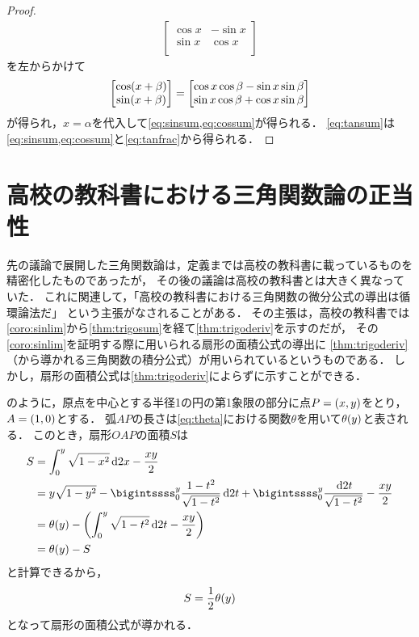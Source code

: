 \documentclass[11pt,a4paper]{ltjsarticle}
\newcommand*{\coord}[1]{\paren{#1}}
\newcommand*{\intd}{\dl2}
\theoremstyle{definition}
\begin{document}
\begin{proof}
\begin{align*}
\begin{bmatrix}
      \cos x & - \sin x \\
      \sin x & \cos x   \\
    \end{bmatrix}
  \end{align*}
  を左からかけて
  \begin{align}
    \begin{bmatrix}
      \apply{\cos}{x + \beta} \\
      \apply{\sin}{x + \beta} \\
    \end{bmatrix}
    =
    \begin{bmatrix}
      \cos x \cos \beta - \sin x \sin \beta \\
      \sin x \cos \beta + \cos x \sin \beta \\
    \end{bmatrix}
    \label{eq:trigosumx}
  \end{align}
  が得られ，$x = \alpha$を代入して\cref{eq:sinsum,eq:cossum}が得られる．
  \cref{eq:tansum}は\cref{eq:sinsum,eq:cossum}と\cref{eq:tanfrac}から得られる．
\end{proof}

\section{高校の教科書における三角関数論の正当性} \label{sec:highschool}

先の議論で展開した三角関数論は，定義までは高校の教科書に載っているものを精密化したものであったが，
その後の議論は高校の教科書とは大きく異なっていた．
これに関連して，「高校の教科書における三角関数の微分公式の導出は循環論法だ」
という主張がなされることがある．
その主張は，高校の教科書では\cref{coro:sinlim}から\cref{thm:trigosum}を経て\cref{thm:trigoderiv}を示すのだが，
その\cref{coro:sinlim}を証明する際に用いられる扇形の面積公式の導出に
\cref{thm:trigoderiv}（から導かれる三角関数の積分公式）が用いられているというものである．
しかし，扇形の面積公式は\cref{thm:trigoderiv}によらずに示すことができる．

のように，原点を中心とする半径1の円の第1象限の部分に点$P = \coord{x,y}$をとり，
$A = \coord{1,0}$とする．
弧$AP$の長さは\cref{eq:theta}における関数$\theta$を用いて$\apply{\theta}{y}$と表される．
このとき，扇形$OAP$の面積$S$は
\begin{align*}
  S & = \int_0^y \sqrt{1 - x^2} \intd x - \frac{xy}{2}                                                                                            \\
    & = y \sqrt{1 - y^2} - \bigintssss_0^y \frac{1 - t^2}{\sqrt{1 - t^2}} \intd t + \bigintssss_0^y \frac{\intd t}{\sqrt{1 - t^2}} - \frac{xy}{2} \\
    & = \apply{\theta}{y} - \paren{ \int_0^y \sqrt{1 - t^2} \intd t - \frac{xy}{2}}                                                               \\
    & = \apply{\theta}{y} - S
\end{align*}
と計算できるから，
\begin{align}
  S = \frac{1}{2} \apply{\theta}{y}
\end{align}
となって扇形の面積公式が導かれる．
\end{document}
